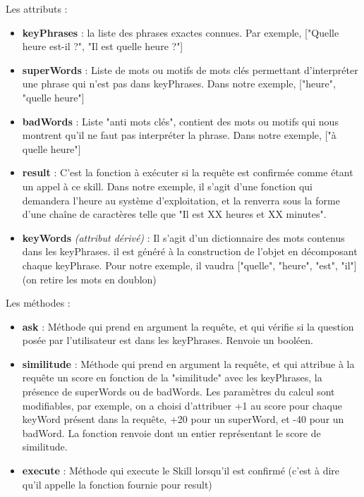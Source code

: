 \documentclass[a4paper,10pt]{report}
\begin{document}
          {Les attributs :}
          \begin{itemize}
            \item \textbf{keyPhrases} : la liste des phrases exactes connues. Par exemple, ["Quelle heure est-il ?", "Il est quelle heure ?"]
            \item \textbf{superWords} : Liste de mots ou motifs de mots clés permettant d'interpréter une phrase qui n'est pas dans keyPhrases. Dans notre exemple, ["heure", "quelle heure"]
            \item \textbf{badWords} : Liste "anti mots clés", contient des mots ou motifs qui nous montrent qu'il ne faut pas interpréter la phrase. Dans notre exemple, ["à quelle heure"]
            \item \textbf{result} : C'est la fonction à exécuter si la requête est confirmée comme étant un appel à ce skill. Dans notre exemple, il s'agit d'une fonction qui demandera l'heure au système d'exploitation, et la renverra sous la forme d'une chaîne de caractères telle que "Il est XX heures et XX minutes".
            \item \textbf{keyWords} \textit{(attribut dérivé)} : Il s'agit d'un dictionnaire des mots contenus dans les keyPhrases. il est généré à la construction de l'objet en décomposant chaque keyPhrase. Pour notre exemple, il vaudra ["quelle", "heure", "est", "il"] (on retire les mots en doublon)\newline
          \end{itemize}
          {Les méthodes :}
          \begin{itemize}
            \item \textbf{ask} : Méthode qui prend en argument la requête, et qui vérifie si la question posée par l'utilisateur est dans les keyPhrases. Renvoie un booléen.
            \item \textbf{similitude} : Méthode qui prend en argument la requête, et qui attribue à la requête un score en fonction de la "similitude" avec les keyPhrases, la présence de superWords ou de badWords. Les paramètres du calcul sont modifiables, par exemple, on a choisi d'attribuer +1 au score pour chaque keyWord présent dans la requête, +20 pour un superWord, et -40 pour un badWord. La fonction renvoie dont un entier représentant le score de similitude.
            \item \textbf{execute} : Méthode qui execute le Skill lorsqu'il est confirmé (c'est à dire qu'il appelle la fonction fournie pour result)\newline
          \end{itemize}
\end{document}
